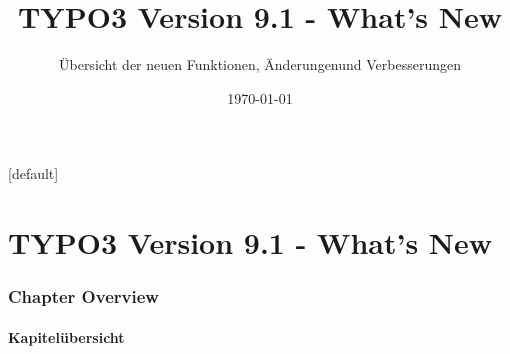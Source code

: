 \documentclass[t]{beamer}
\title{TYPO3 Version 9.1 - What's New}
\subtitle{Übersicht der neuen Funktionen, Änderungen\newline und Verbesserungen}
\date{\today}
\begin{document}
\sharefont


\begingroup
	[default]
	\begin{frame}
		\titlepage
	\end{frame}
\endgroup


\section*{TYPO3 Version 9.1 - What's New}
\begin{frame}[fragile]
	\frametitle{Chapter Overview}
	\framesubtitle{Kapitelübersicht}

	\tableofcontents

\end{frame}










\end{document}
